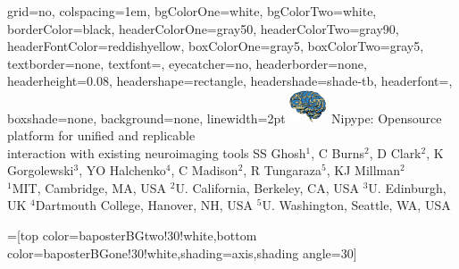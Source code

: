 \documentclass[portrait,final]{baposter}
\begin{document}
\newlength{\leftimgwidth}
\begin{poster}%
  {
  grid=no,
  colspacing=1em,
  bgColorOne=white,
  bgColorTwo=white,
  borderColor=black,
  headerColorOne=gray50,
  headerColorTwo=gray90,
  headerFontColor=reddishyellow,
  boxColorOne=gray5,
  boxColorTwo=gray5,
  textborder=none, %
  textfont=\sf, %
  eyecatcher=no,
  headerborder=none,
  headerheight=0.08\textheight,
  headershape=rectangle,
  headershade=shade-tb,
  headerfont=\Large\textsf, %
  boxshade=none, %
  background=none,
  linewidth=2pt
  }
  {\includegraphics[width=3em]{nipylogo}} %
  {\sf %
  Nipype: Opensource platform for unified and replicable\\ interaction
  with existing neuroimaging tools\vspace{0.15em}}
 {\centering\sf %
    SS Ghosh$^1$, C Burns$^2$, D Clark$^2$, K Gorgolewski$^3$, YO
    Halchenko$^4$, C Madison$^2$, R Tungaraza$^5$, KJ
    Millman$^2$\\
    \small\sf$^1$MIT, Cambridge, MA, USA $^2$U. California, Berkeley, CA, USA $^3$U. Edinburgh, UK
    $^4$Dartmouth College, Hanover, NH, USA $^5$U. Washington, Seattle, WA, USA\vspace{-0.4em}}


  =[top color=baposterBGtwo!30!white,bottom color=baposterBGone!30!white,shading=axis,shading angle=30]

     \setlength{\leftimgwidth}{0.78em+8.0em}


\end{poster}
\end{document}
